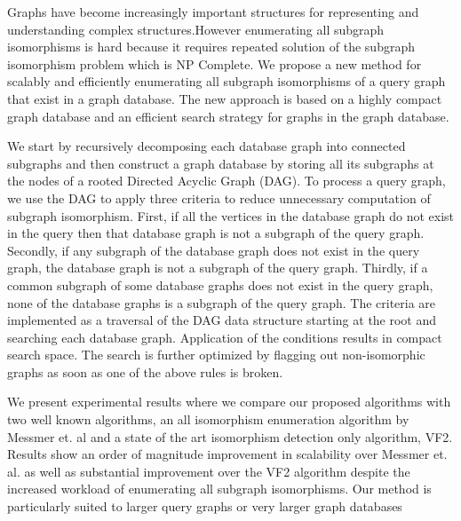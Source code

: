 
Graphs have become increasingly important structures for representing and understanding complex structures.However enumerating all subgraph isomorphisms is hard because it requires repeated solution of the subgraph isomorphism problem which is NP Complete.
We propose a new method for scalably and efficiently 
enumerating all subgraph isomorphisms of a query graph that exist in a graph database. The new approach is based on a highly compact graph database and an efficient search strategy for graphs in the graph database.

We start by recursively decomposing each database graph into connected subgraphs and then construct a graph database by storing all its subgraphs at the nodes of a rooted Directed Acyclic Graph (DAG). To process a query graph, we use the DAG to apply three criteria to reduce unnecessary computation of subgraph isomorphism. First, if all the vertices in the database graph do not exist in the query then that database graph is not a subgraph of the query graph. Secondly, if any subgraph of the database graph does not exist in the query graph, the database graph is not a subgraph of the query graph. Thirdly, if a common subgraph of some database graphs does not exist in the query graph, none of the database graphs is a subgraph of the query graph. The criteria are implemented as a traversal of the DAG data structure starting at the root and searching each database graph. Application of the conditions results in compact search space. The search is further optimized by flagging out non-isomorphic graphs as soon as one of the above rules is broken. 

We present experimental results where we compare our proposed algorithms with two well known algorithms, an all isomorphism enumeration algorithm by Messmer et. al and a state of the art isomorphism detection only algorithm, VF2. Results show an order of magnitude improvement in scalability over Messmer et. al. as well as substantial improvement over the VF2 algorithm despite the increased workload of enumerating all subgraph isomorphisms. Our method is particularly suited to larger query graphs or very larger graph databases
